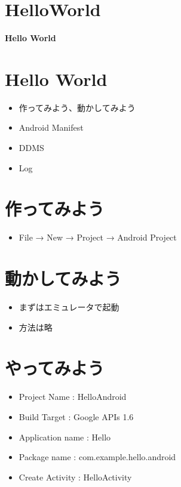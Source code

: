 \documentclass[slide,papersize]{jsarticle}
\begin{document}
\section*{HelloWorld}
\vspace*{15mm}
\begin{center}
{\Huge {\bf Hello World}}
\end{center}

\section*{Hello World}
\bigskip
\begin{itemize}
\item 作ってみよう、動かしてみよう
\bigskip
\item Android Manifest
\bigskip
\item DDMS
\bigskip
\item Log
\end{itemize}

\section*{作ってみよう}
\bigskip
\begin{itemize}
\item File → New → Project → Android Project
\end{itemize}

\section*{動かしてみよう}
\bigskip
\begin{itemize}
\item まずはエミュレータで起動
\bigskip
\item 方法は略
\end{itemize}

\section*{やってみよう}
\bigskip
\begin{itemize}
\item Project Name : HelloAndroid
\medskip
\item Build Target : Google APIs 1.6
\medskip
\item Application name : Hello
\medskip
\item Package name : com.example.hello.android
\medskip
\item Create Activity : HelloActivity
\end{itemize}
\end{document}
